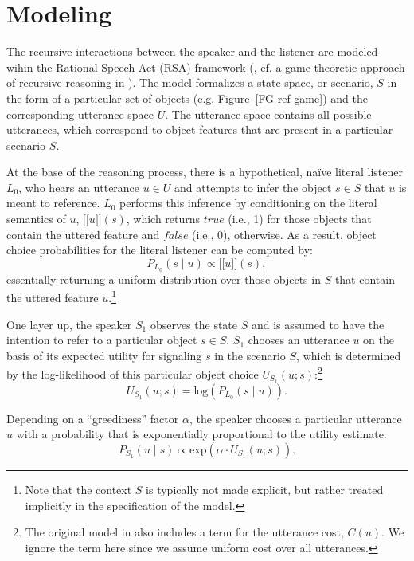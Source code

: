 \documentclass[10pt,a4paper]{article}
\newcommand{\sem}[1]{\mbox{$[\![$#1$]\!]$}}
\begin{document}
\section{Modeling}

The recursive interactions between the speaker and the listener are modeled wihin the Rational Speech Act (RSA)  framework (, cf. a game-theoretic approach of recursive reasoning in ).
The model formalizes a state space, or scenario, $S$ in the form of a particular set of objects (e.g. Figure~\ref{FG-ref-game}) and the corresponding utterance space $U$.
The utterance space contains all possible utterances, which correspond to object features that are present in a particular scenario $S$.

At the base of the reasoning process, there is a hypothetical, na\"ive literal listener $L_0$, who hears an utterance $u\in U$ and attempts to infer the object $s \in S$ that $u$ is meant to reference. 
$L_0$ performs this inference by conditioning on the literal semantics of $u$, \sem{$u$}$(s)$, which returns $true$ (i.e., 1) for those objects that contain the uttered feature and $false$ (i.e., 0), otherwise.
As a result, object choice probabilities for the literal listener can be computed by: 
\begin{equation}
P_{L_{0}}(s\mid u) \propto \sem{$u$}(s),
\end{equation}
essentially returning a uniform distribution over those objects in $S$ that contain the uttered feature $u$.\footnote{Note that the context $S$ is typically not made explicit, but rather treated implicitly in the specification of the model.}


One layer up, the speaker $S_1$ observes the state $S$ and is assumed to have the intention to refer to a particular object $s \in S$.
$S_1$ chooses an utterance $u$ on the basis of its expected utility for signaling $s$ in the scenario $S$, which is determined by the log-likelihood of this particular object choice $U_{S_1}(u;s)$:\footnote{The original model in  also includes a term for the utterance cost, $C(u)$. We ignore the term here since we assume uniform cost over all utterances.}
\begin{equation}
U_{S_{1}}(u;s) = \textrm{log}(P_{L_{0}}(s \mid u)).
\end{equation}

Depending on a ``greediness'' factor $\alpha$, the speaker chooses a particular utterance $u$ with a probability that is exponentially proportional to the utility estimate: 
\begin{equation}
P_{S_{1}} (u \mid s) \propto   \textrm{exp}(\alpha \cdot U_{S_{1}} (u;s)).
\end{equation}
\end{document}
